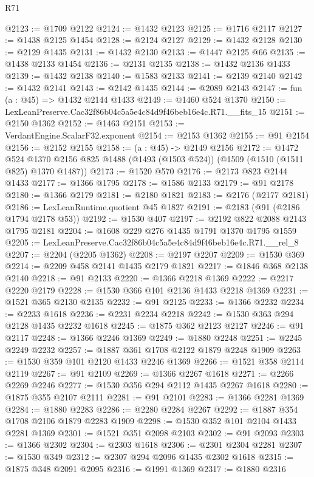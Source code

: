 \begin{lexlean}{R71}
\begin{coremodule}
@2123 := @1709 @2122
@2124 := @1432 @2123
@2125 := @1716 @2117
@2127 := @1438 @2125 @1454
@2128 := @2124 @2127
@2129 := @1432 @2128
@2130 := @2129 @1435
@2131 := @1432 @2130
@2133 := @1447 @2125 @66
@2135 := @1438 @2133 @1454
@2136 := @2131 @2135
@2138 := @1432 @2136 @1433
@2139 := @1432 @2138
@2140 := @1583 @2133
@2141 := @2139 @2140
@2142 := @1432 @2141
@2143 := @2142 @1435
@2144 := @2089 @2143
@2147 := fun (a : @45) => @1432 @2144 @1433
@2149 := @1460 @524 @1370
@2150 := LexLeanPreserve.Cac32f86b04c5a5e4c84d9f46beb16e4c.R71.__fits_15
@2151 := @2150 @1362
@2152 := @1463 @2151
@2153 := VerdantEngine.ScalarF32.exponent
@2154 := @2153 @1362
@2155 := @91 @2154
@2156 := @2152 @2155
@2158 := (a : @45) -> @2149 @2156
@2172 := @1472
    @524
    @1370
    @2156
    @825
    @1488
    (@1493 (@1503 @524))
    (@1509 (@1510 (@1511 @825) @1370 @1487))
@2173 := @1520 @570
@2176 := @2173 @823 @2144 @1433
@2177 := @1366 @1795
@2178 := @1586 @2133
@2179 := @91 @2178
@2180 := @1366 @2179
@2181 := @2180 @1821
@2183 := @2176 (@2177 @2181)
@2186 := LexLeanRuntime.quotient @45 @1827
@2191 := @2183 (@91 (@2186 @1794 @2178 @53))
@2192 := @1530 @407
@2197 := @2192 @822 @2088 @2143 @1795 @2181
@2204 := @1608 @229 @276 @1435 @1791 @1370 @1795 @1559
@2205 := LexLeanPreserve.Cac32f86b04c5a5e4c84d9f46beb16e4c.R71.__rel_8
@2207 := @2204 (@2205 @1362)
@2208 := @2197 @2207
@2209 := @1530 @369
@2214 := @2209 @458 @2141 @1435 @2179 @1821
@2217 := @1846 @368 @2138 @2140
@2218 := @91 @2133
@2220 := @1366 @2218 @1369
@2222 := @2217 @2220 @2179
@2228 := @1530 @366 @101 @2136 @1433 @2218 @1369
@2231 := @1521 @365 @2130 @2135
@2232 := @91 @2125
@2233 := @1366 @2232
@2234 := @2233 @1618
@2236 := @2231 @2234 @2218
@2242 := @1530 @363 @294 @2128 @1435 @2232 @1618
@2245 := @1875 @362 @2123 @2127
@2246 := @91 @2117
@2248 := @1366 @2246 @1369
@2249 := @1880 @2248
@2251 := @2245 @2249 @2232
@2257 := @1887 @361 @1708 @2122 @1879 @2248 @1909
@2263 := @1530 @359 @101 @2120 @1433 @2246 @1369
@2266 := @1521 @358 @2114 @2119
@2267 := @91 @2109
@2269 := @1366 @2267 @1618
@2271 := @2266 @2269 @2246
@2277 := @1530 @356 @294 @2112 @1435 @2267 @1618
@2280 := @1875 @355 @2107 @2111
@2281 := @91 @2101
@2283 := @1366 @2281 @1369
@2284 := @1880 @2283
@2286 := @2280 @2284 @2267
@2292 := @1887 @354 @1708 @2106 @1879 @2283 @1909
@2298 := @1530 @352 @101 @2104 @1433 @2281 @1369
@2301 := @1521 @351 @2098 @2103
@2302 := @91 @2093
@2303 := @1366 @2302
@2304 := @2303 @1618
@2306 := @2301 @2304 @2281
@2307 := @1530 @349
@2312 := @2307 @294 @2096 @1435 @2302 @1618
@2315 := @1875 @348 @2091 @2095
@2316 := @1991 @1369
@2317 := @1880 @2316

\end{coremodule}
\end{lexlean}
